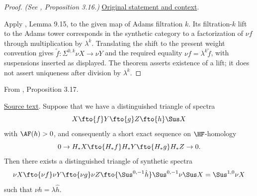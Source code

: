 \begin{proof}
\textit{(See \cite{LWX126}, Proposition 3.16.)} \href{paper/main.tex.html#L912}{Original statement and context}.

Apply \cite{BHS}, Lemma 9.15, to the given map of Adams filtration $k$. Its filtration-$k$ lift to the Adams tower corresponds in the synthetic category to a factorization of $\nu f$ through multiplication by $\lambda^k$. Translating the shift to the present weight convention gives $\widetilde f:\Sigma^{0,k}\nu X\to\nu Y$ and the required equality $\nu f=\lambda^k\widetilde f$, with suspensions inserted as displayed. The theorem asserts existence of a lift; it does not assert uniqueness after division by $\lambda^k$.
\end{proof}

\begin{proposition}
\label{paper:3.17}
From \cite{LWX126}, Proposition 3.17.\par

\href{paper/main.tex.html#L929}{Source text}.
\label{prop:41561db2}
    Suppose that we have a  distinguished triangle of spectra
    $$X\fto{f} Y\fto{g} Z\fto{h} \Sus X$$
    with $\AF(h)>0$, and consequently a short exact sequence on $\HF$-homology
    $$0\to H_*X\fto{H_*f} H_*Y\fto{H_*g} H_*Z\to 0.$$
    Then there exists a distinguished triangle of synthetic spectra
    $$\nu X\fto{\nu f}\nu Y\fto{\nu g} \nu Z\fto{\Sus^{0,-1}\hat h} \Sus^{0,-1}\nu \Sus X=\Sus^{1,0}\nu X$$
    such that $\nu h=\lambda \hat h$.



\end{proposition}
